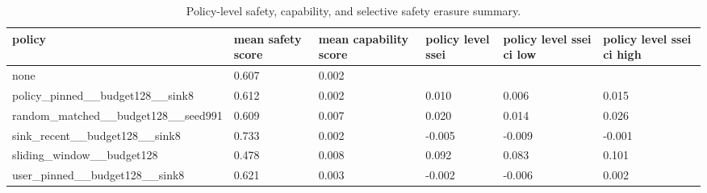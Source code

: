 \begin{table}[t]
\centering
\small
\setlength{\tabcolsep}{3pt}
\begin{tabularx}{\linewidth}{@{}lXXXXX@{}}
\toprule
policy & mean safety score & mean capability score & policy level ssei & policy level ssei ci low & policy level ssei ci high \\
\midrule
none & 0.607 & 0.002 &  &  &  \\
policy\_pinned\_\_budget128\_\_sink8 & 0.612 & 0.002 & 0.010 & 0.006 & 0.015 \\
random\_matched\_\_budget128\_\_seed991 & 0.609 & 0.007 & 0.020 & 0.014 & 0.026 \\
sink\_recent\_\_budget128\_\_sink8 & 0.733 & 0.002 & -0.005 & -0.009 & -0.001 \\
sliding\_window\_\_budget128 & 0.478 & 0.008 & 0.092 & 0.083 & 0.101 \\
user\_pinned\_\_budget128\_\_sink8 & 0.621 & 0.003 & -0.002 & -0.006 & 0.002 \\
\bottomrule
\end{tabularx}
\caption{Policy-level safety, capability, and selective safety erasure summary.}
\label{tab:main-results}
\end{table}
